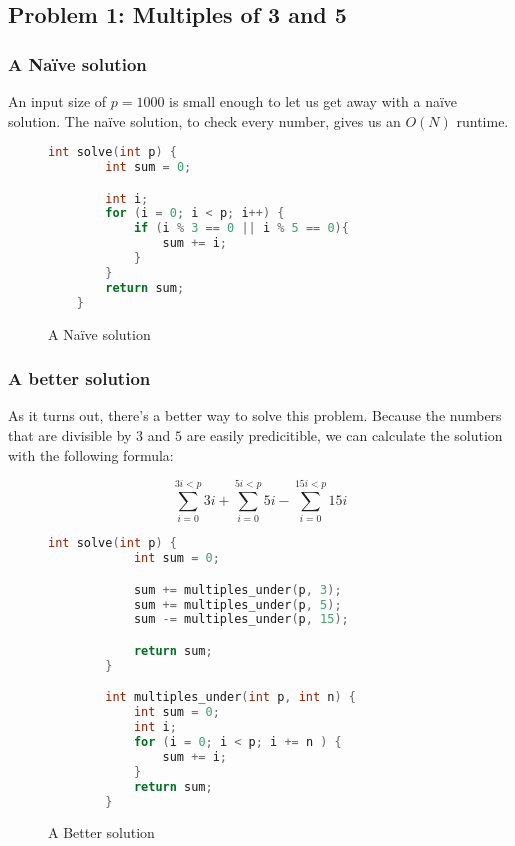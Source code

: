 \documentclass[main.tex]{subfiles}
\begin{document}
\subsection{Problem 1: Multiples of 3 and 5}
\subsubsection{A Naïve solution}

An input size of $p=1000$ is small enough to let us get away with a naïve solution.
The naïve solution, to check every number, gives us an $O(N)$ runtime.

\begin{figure}[H]
    \centering
    \begin{lstlisting}[language=c]
    int solve(int p) {
        int sum = 0;

        int i;
        for (i = 0; i < p; i++) {
            if (i % 3 == 0 || i % 5 == 0){
                sum += i;
            }
        }
        return sum;
    }
    \end{lstlisting}
\caption{A Naïve solution}
\end{figure}

\subsubsection{A better solution}
As it turns out, there's a better way to solve this problem.
Because the numbers that are divisible by $3$ and $5$ are easily predicitible, we can calculate the solution with the following formula:

\[
  \sum_{i=0}^{3i < p}3i
+ \sum_{i=0}^{5i < p}5i
- \sum_{i=0}^{15i < p}15i
\]

\begin{figure}[H]
    \centering
    \begin{lstlisting}[language=c]
        int solve(int p) {
            int sum = 0;

            sum += multiples_under(p, 3);
            sum += multiples_under(p, 5);
            sum -= multiples_under(p, 15);

            return sum;
        }

        int multiples_under(int p, int n) {
            int sum = 0;
            int i;
            for (i = 0; i < p; i += n ) {
                sum += i;
            }
            return sum;
        }
    \end{lstlisting}
\caption{A Better solution}
\end{figure}
\end{document}
